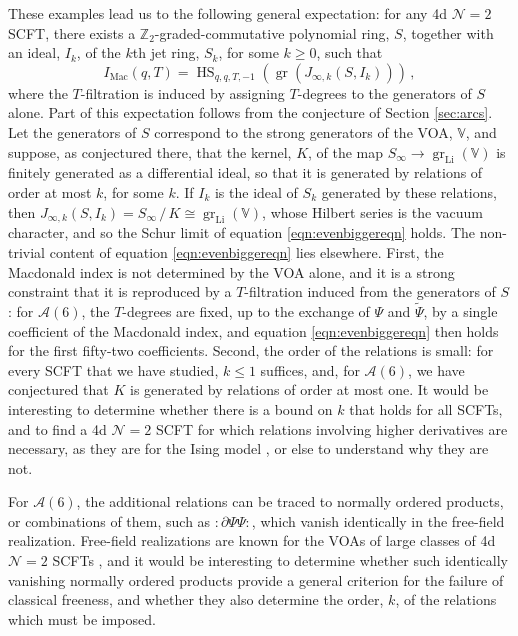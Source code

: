 \documentclass[12pt]{article}
\numberwithin{equation}{section}
\numberwithin{figure}{section}
\theoremstyle{plain}
\theoremstyle{definition}
\begin{document}
These examples lead us to the following general expectation: for any 4d $\mathcal{N}=2$ SCFT, there exists a $\mathbb{Z}_2$-graded-commutative polynomial ring, $S$, together with an ideal, $I_k$, of the $k$th jet ring, $S_k$, for some $k \geq 0$, such that
\begin{equation}\label{eqn:evenbiggereqn}
	I_\text{Mac}(q, T) = \operatorname{HS}_{q,q,T,-1}(\operatorname{gr}(J_{\infty,k}(S, I_k))) \,,
\end{equation}
where the $T$-filtration is induced by assigning $T$-degrees to the generators of $S$ alone. Part of this expectation follows from the conjecture of Section \ref{sec:arcs}. Let the generators of $S$ correspond to the strong generators of the VOA, $\mathbb{V}$, and suppose, as conjectured there, that the kernel, $K$, of the map $S_\infty \rightarrow \operatorname{gr}_{\operatorname{Li}}(\mathbb{V})$ is finitely generated as a differential ideal, so that it is generated by relations of order at most $k$, for some $k$. If $I_k$ is the ideal of $S_k$ generated by these relations, then $J_{\infty,k}(S, I_k) = S_\infty \, / \, K \cong \operatorname{gr}_{\operatorname{Li}}(\mathbb{V})$, whose Hilbert series is the vacuum character, and so the Schur limit of equation \eqref{eqn:evenbiggereqn} holds. The non-trivial content of equation \eqref{eqn:evenbiggereqn} lies elsewhere. First, the Macdonald index is not determined by the VOA alone, and it is a strong constraint that it is reproduced by a $T$-filtration induced from the generators of $S$: for $\mathcal{A}(6)$, the $T$-degrees are fixed, up to the exchange of $\Psi$ and $\widetilde{\Psi}$, by a single coefficient of the Macdonald index, and equation \eqref{eqn:evenbiggereqn} then holds for the first fifty-two coefficients. Second, the order of the relations is small: for every SCFT that we have studied, $k \leq 1$ suffices, and, for $\mathcal{A}(6)$, we have conjectured that $K$ is generated by relations of order at most one. It would be interesting to determine whether there is a bound on $k$ that holds for all SCFTs, and to find a 4d $\mathcal{N}=2$ SCFT for which relations involving higher derivatives are necessary, as they are for the Ising model \cite{MR4589087}, or else to understand why they are not.

For $\mathcal{A}(6)$, the additional relations can be traced to normally ordered products, or combinations of them, such as $:\!\partial\Psi\Psi\!:$, which vanish identically in the free-field realization. Free-field realizations are known for the VOAs of large classes of 4d $\mathcal{N}=2$ SCFTs \cite{Bonetti:2018fqz}, and it would be interesting to determine whether such identically vanishing normally ordered products provide a general criterion for the failure of classical freeness, and whether they also determine the order, $k$, of the relations which must be imposed.
\end{document}
